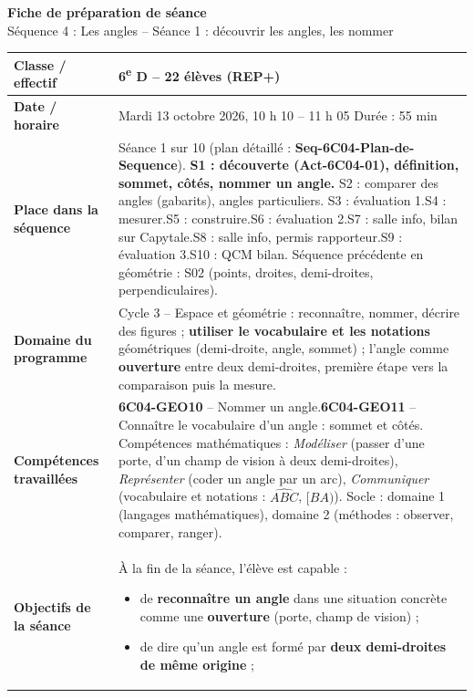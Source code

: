\documentclass[11pt]{article}
\newcommand{\champ}[2]{\textbf{#1} & #2 \\ \hline}
\begin{document}
\begin{center}
{\Large\bfseries Fiche de préparation de séance}\\[1mm]
{\large Séquence 4 : Les angles -- Séance 1 : découvrir les angles, les nommer}
\end{center}

\renewcommand{\arraystretch}{1.35}
\begin{tabularx}{\linewidth}{|>{\raggedright\arraybackslash}p{3.6cm}|X|}
\hline
\champ{Classe / effectif}{6\textsuperscript{e} D -- 22 élèves (REP+)}
\champ{Date / horaire}{Mardi 13 octobre 2026, 10 h 10 -- 11 h 05 \qquad Durée : 55 min}
\champ{Place dans la séquence}{Séance 1 sur 10 (plan détaillé : \textbf{Seq-6C04-Plan-de-Sequence}).\enskip
\textbf{S1 : découverte (Act-6C04-01), définition, sommet, côtés, nommer un angle.}\enskip
S2 : comparer des angles (gabarits), angles particuliers.\enskip
S3 : évaluation 1.\enskip S4 : mesurer.\enskip S5 : construire.\enskip S6 : évaluation 2.\enskip S7 : salle info, bilan sur Capytale.\enskip S8 : salle info, permis rapporteur.\enskip S9 : évaluation 3.\enskip S10 : QCM bilan.\newline
Séquence précédente en géométrie : S02 (points, droites, demi-droites, perpendiculaires).}
\champ{Domaine du programme}{Cycle 3 -- Espace et géométrie : reconnaître, nommer, décrire des figures ; \textbf{utiliser le vocabulaire et les notations} géométriques (demi-droite, angle, sommet) ; l'angle comme \textbf{ouverture} entre deux demi-droites, première étape vers la comparaison puis la mesure.}
\champ{Compétences travaillées}{\textbf{6C04-GEO10} -- Nommer un angle.\newline \textbf{6C04-GEO11} -- Connaître le vocabulaire d'un angle : sommet et côtés.\newline
Compétences mathématiques : \textit{Modéliser} (passer d'une porte, d'un champ de vision à deux demi-droites), \textit{Représenter} (coder un angle par un arc), \textit{Communiquer} (vocabulaire et notations : $\widehat{ABC}$, $[BA)$).\newline
Socle : domaine 1 (langages mathématiques), domaine 2 (méthodes : observer, comparer, ranger).}
\champ{Objectifs de la séance}{À la fin de la séance, l'élève est capable :
\begin{itemize}[nosep,leftmargin=1.2em]
\item de \textbf{reconnaître un angle} dans une situation concrète comme une \textbf{ouverture} (porte, champ de vision) ;
\item de dire qu'un angle est formé par \textbf{deux demi-droites de même origine} ;

\end{itemize}}
\end{tabularx}
\end{document}
